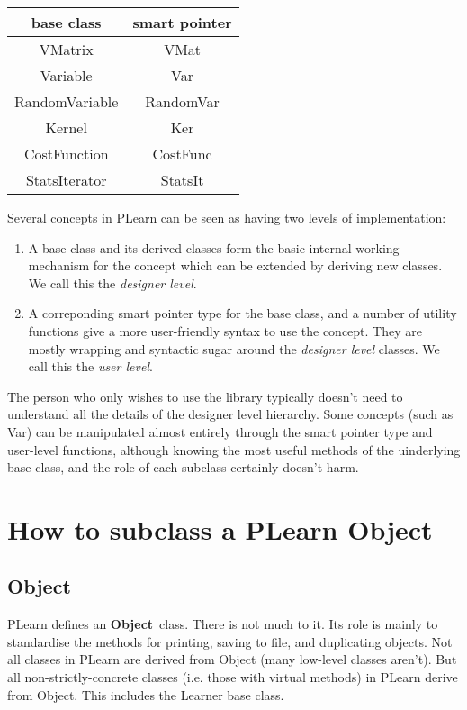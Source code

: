 \documentclass[11pt]{book}
\newcommand{\Object}{{\bf Object}}
\begin{document}
\begin{tabular}{|c|c|}
\hline
base class &smart pointer \\
 \hline
VMatrix &VMat \\
 \hline
Variable &Var \\
 \hline
RandomVariable &RandomVar \\
 \hline
Kernel &Ker \\
 \hline
CostFunction &CostFunc \\
 \hline
StatsIterator &StatsIt \\
 \hline

\end{tabular}




Several concepts in PLearn can be seen as having two levels of
implementation:

 \begin{enumerate}

\item A base class and its derived classes form the basic internal
working mechanism for the concept which can be extended by deriving new
classes. We call this the \emph{designer level}.

\item A correponding smart pointer type for the base class, and a
number of utility functions give a more user-friendly syntax to use
the concept. They are mostly wrapping and syntactic sugar around the
\emph{designer level} classes. We call this the \emph{user level}.

\end{enumerate}

The person who only wishes to use the library typically doesn't need
to understand all the details of the designer level hierarchy. Some
concepts (such as Var) can be manipulated almost entirely through the
smart pointer type and user-level functions, although knowing the most
useful methods of the uinderlying base class, and the role of each
subclass certainly doesn't harm.

\section{How to subclass a PLearn \Object}
\label{Object}

\subsection{\Object}

 PLearn defines an \Object\ class. There is not much to it. Its role
is mainly to standardise the methods for printing, saving to file, and
duplicating objects. Not all classes in PLearn are derived from Object
(many low-level classes aren't). But all non-strictly-concrete classes
(i.e. those with virtual methods) in PLearn derive from Object. This
includes the Learner base class.
\end{document}
